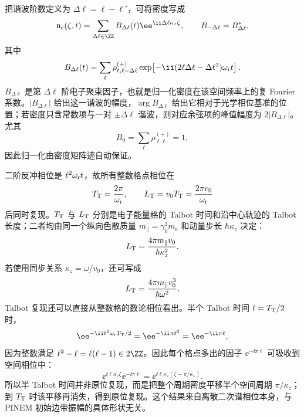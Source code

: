把谐波阶数定义为 $\Delta\ell=\ell-\ell'$，可将密度写成
\begin{equation}
 \mathfrak n_e(\zeta,t)
 =\sum_{\Delta\ell\in\ZZ}B_{\Delta\ell}(t)\ee^{\ii \Delta\ell\kappa_z\zeta},
 \qquad B_{-\Delta\ell}=B_{\Delta\ell}^*,
\label{eq:electron_density_harmonic_expansion_dp46}
\end{equation}
其中
\begin{equation}
{
 B_{\Delta\ell}(t)
 =\sum_{\ell}
 \rho_{\ell,\ell-\Delta\ell}^{(+)}
 \exp\!\left[-\ii(2\ell \Delta\ell-\Delta\ell^2)\omega_{\rm r}t\right].}
\label{eq:electron_bunching_harmonic_dp46}
\end{equation}
$B_{\Delta\ell}$ 是第 $\Delta\ell$ 阶电子聚束因子，也就是归一化密度在该空间频率上的复 Fourier 系数。$|B_{\Delta\ell}|$ 给出这一谐波的幅度，$\arg B_{\Delta\ell}$ 给出它相对于光学相位基准的位置；若密度只含常数项与一对 $\pm\Delta\ell$ 谐波，则对应余弦项的峰值幅度为 $2|B_{\Delta\ell}|$。尤其
\begin{equation*}
 B_0=\sum_\ell\rho_{\ell\ell}^{(+)}=1,
\end{equation*}
因此归一化由密度矩阵迹自动保证。

二阶反冲相位是 $\ell^2\omega_{\rm r}t$，故所有整数格点相位在
\begin{equation}
{
 T_{\rm T}=\frac{2\pi}{\omega_{\rm r}},
 \qquad
 L_{\rm T}=v_0T_{\rm T}
 =\frac{2\pi v_0}{\omega_{\rm r}}}
\label{eq:electron_talbot_time_length_dp46}
\end{equation}
后同时复现。$T_{\rm T}$ 与 $L_{\rm T}$ 分别是电子能量格的 Talbot 时间和沿中心轨迹的 Talbot 长度；二者均由同一个纵向色散质量
$m_\parallel=\gamma_0^3m_{\mathrm e}$ 和动量步长 $\hbar \kappa_z$ 决定：
\begin{equation*}
 L_{\rm T}
 =\frac{4\pi m_\parallel v_0}{\hbar \kappa_z^2}.
\end{equation*}
若使用同步关系 $\kappa_z=\omega/v_0$，还可写成
\begin{equation*}
 L_{\rm T}
 =\frac{4\pi m_\parallel v_0^3}{\hbar\omega^2}.
\end{equation*}
Talbot 复现还可以直接从整数格的数论相位看出。半个 Talbot 时间 $t=T_{\rm T}/2$ 时，
\begin{equation*}
 \ee^{-\ii\ell^2\omega_{\rm r}T_{\rm T}/2}
 =\ee^{-\ii\pi\ell^2}
 =\ee^{-\ii\pi\ell},
\end{equation*}
因为整数满足 $\ell^2-\ell=\ell(\ell-1)\in2\ZZ$。因此每个格点多出的因子 $\ee^{-\ii\pi\ell}$ 可吸收到空间相位中：
\begin{equation*}
 \ee^{\ii\ell\kappa_z\zeta}\ee^{-\ii\pi\ell}
 =\ee^{\ii\ell\kappa_z(\zeta-\pi/\kappa_z)}.
\end{equation*}
所以半 Talbot 时间并非原位复现，而是把整个周期密度平移半个空间周期 $\pi/\kappa_z$；到 $T_{\rm T}$ 时该平移再消失，得到原位复现。这个结果来自离散二次谱相位本身，与 PINEM 初始边带振幅的具体形状无关。

